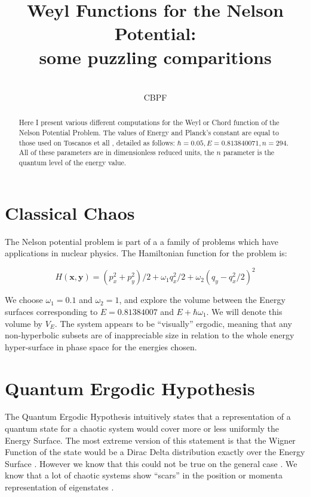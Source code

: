 \documentclass[a4paper,12pt]{article}
\title{ Weyl Functions for the Nelson Potential:\\ some puzzling comparitions}
\author{\\CBPF}
\newcommand{\xfase}{\mathbf{x}}
\newcommand{\yfase}{\mathbf{y}}
\begin{document}
\maketitle

\begin{abstract}
Here I present various different computations for the Weyl or Chord 
function of the Nelson Potential Problem. The values of Energy
and Planck's constant are equal to  those used on
Toscanos et all \cite{Toscano01}, detailed as follows: 
$\hbar=0.05, E=0.813840071, n=294.$
All of these parameters are in dimensionless reduced units, 
the $n$ parameter is the quantum level of the energy value.
\end{abstract}

\section{Classical Chaos}

The Nelson potential problem is part of a a family of problems which
have applications in nuclear physics. The Hamiltonian function 
for the problem is:

\begin{equation}
H(\xfase,\yfase)=(p_x^2+p_y^2)/2+\omega_1 q_x^2/2+
\omega_2(q_y-q_x^2/2)^2
\end{equation}

We choose $\omega_1=0.1$ and $\omega_2=1$, and explore the volume
between the Energy surfaces corresponding to $E=0.81384007$
and $E+\hbar\omega_1$. 
We will denote this volume by $V_E$. The system
appears to be ``visually''  ergodic, meaning that any non-hyperbolic
subsets are of inappreciable size in relation to the whole
energy hyper-surface in phase space for the energies chosen. 

 
\section{Quantum Ergodic Hypothesis}

The Quantum Ergodic Hypothesis  intuitively states that a representation
of a quantum state for a chaotic system would cover more or less uniformly
the Energy Surface. The most extreme version of this statement is
that the Wigner Function of the state would be a Dirac Delta distribution
 exactly over the Energy Surface \cite{BerryRIR}. However we know
that this could not be true on the general case \cite{Ozorio98}. We know
that a lot of chaotic systems show ``scars'' in the position
or momenta
representation of  eigenstates \cite{haake}.
 
\end{document}
